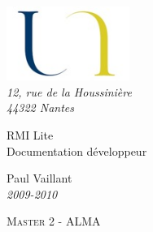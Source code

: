 \begin{titlepage}

\vspace*{2cm}



\begin{flushleft}
	\hspace{1cm} \includegraphics*[width=4cm]{img/logo.jpg}\\
	\hspace{1cm} \textsl{12, rue de la Houssinière}\\
	\hspace{1cm} \textit{44322 Nantes}
	\hrulefill
\end{flushleft}




\vspace{2cm}

\begin{flushright}

	{\fontsize{1.4cm}{1.65cm}\selectfont 
RMI Lite} 	 \\

	{\fontsize{0.7cm}{0.825cm}\selectfont 
Documentation développeur} 	 \\

	\vspace{1cm}

	Paul Vaillant \\

	\textit{2009-2010}
	
\end{flushright}


\vspace{2cm}

\begin{flushleft}



	\hspace{1cm} \textsc{Master 2 - ALMA}\\
	
\end{flushleft}

\hspace*{0,5cm}\hrulefill
\end{titlepage}
